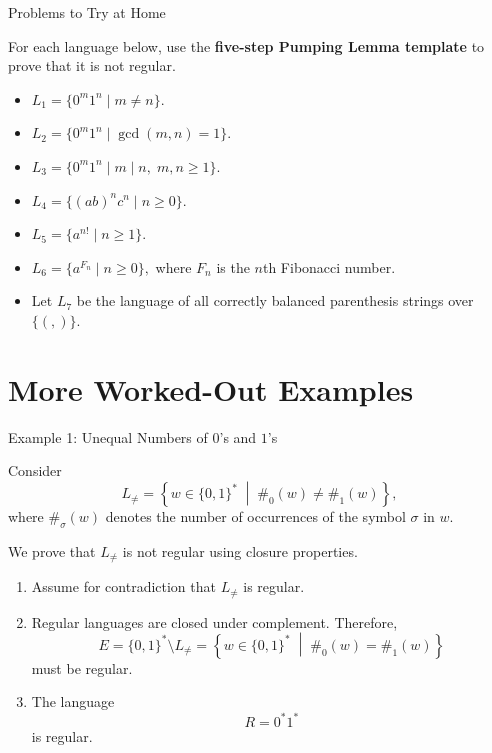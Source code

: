 \documentclass[10pt,aspectratio=169]{beamer}
\begin{document}
\begin{frame}{Problems to Try at Home}

\small
For each language below, use the \textbf{five-step Pumping Lemma
template} to prove that it is not regular.

\begin{itemize}
    \item
    \(
    L_1=\{0^m1^n\mid m\neq n\}.
    \)

    \item
    \(
    L_2=\{0^m1^n\mid \gcd(m,n)=1\}.
    \)

    \item
    \(
    L_3=\{0^m1^n\mid m\mid n,\;m,n\geq 1\}.
    \)

    \item
    \(
    L_4=\{(ab)^nc^n\mid n\geq 0\}.
    \)

    \item
    \(
    L_5=\{a^{n!}\mid n\geq 1\}.
    \)

    \item
    \(
    L_6=\{a^{F_n}\mid n\geq 0\},
    \)
    where $F_n$ is the $n$th Fibonacci number.

    \item Let $L_7$ be the language of all correctly balanced
    parenthesis strings over $\{(,)\}$.
\end{itemize}


\end{frame}


\section{More Worked-Out Examples}

\begin{frame}{Example 1: Unequal Numbers of \(0\)'s and \(1\)'s}

\small
Consider
\[
L_{\neq}
=
\left\{
w\in\{0,1\}^*
\;\middle|\;
\#_0(w)\neq \#_1(w)
\right\},
\]
where \(\#_\sigma(w)\) denotes the number of occurrences of the
symbol \(\sigma\) in \(w\).

\vspace{0.4em}
We prove that \(L_{\neq}\) is not regular using closure properties.

\begin{enumerate}
    \item Assume for contradiction that \(L_{\neq}\) is regular.

    \item Regular languages are closed under complement. Therefore,
    \[
    E
    =
    \{0,1\}^*\setminus L_{\neq}
    =
    \left\{
    w\in\{0,1\}^*
    \;\middle|\;
    \#_0(w)=\#_1(w)
    \right\}
    \]
    must be regular.

    \item The language
    \[
    R=0^*1^*
    \]
    is regular.
\end{enumerate}

\end{frame}
\end{document}

